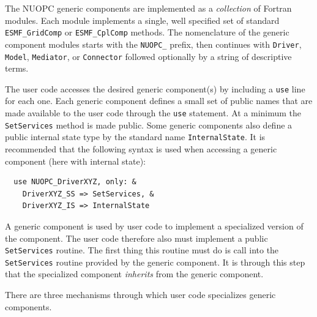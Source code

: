 
The NUOPC generic components are implemented as a {\em collection} of Fortran modules. Each module implements a single, well specified set of standard {\tt ESMF\_GridComp} or {\tt ESMF\_CplComp} methods. The nomenclature of the generic component modules starts with the {\tt NUOPC\_} prefix, then continues with {\tt Driver}, {\tt Model}, {\tt Mediator}, or {\tt Connector} followed optionally by a string of descriptive terms.

The user code accesses the desired generic component(s) by including a {\tt use} line for each one. Each generic component defines a small set of public names that are made available to the user code through the {\tt use} statement. At a minimum the {\tt SetServices} method is made public. Some generic components also define a public internal state type by the standard name {\tt InternalState}. It is recommended that the following syntax is used when accessing a generic component (here with internal state):

\begin{verbatim}
  use NUOPC_DriverXYZ, only: &
    DriverXYZ_SS => SetServices, &
    DriverXYZ_IS => InternalState
\end{verbatim}

A generic component is used by user code to implement a specialized version of the component. The user code therefore also must implement a public {\tt SetServices} routine. The first thing this routine must do is call into the {\tt SetServices} routine provided by the generic component. It is through this step that the specialized component {\em inherits} from the generic component.

There are three mechanisms through which user code specializes generic components.

